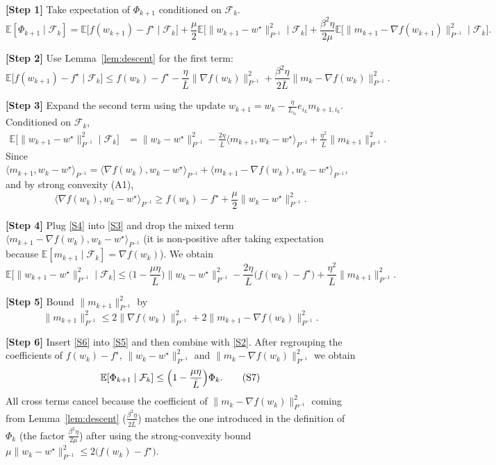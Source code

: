 \documentclass{article}
\newcommand{\E}{\mathbb{E}}
\begin{document}
\noindent\textbf{[Step 1]} Take expectation of $\Phi_{k+1}$ conditioned on
$\mathcal{F}_k$.
\[
\E[\Phi_{k+1}\mid\mathcal{F}_k]
= \E\!\bigl[f(w_{k+1})-f^\star\mid\mathcal{F}_k\bigr]
  +\frac{\mu}{2}\E\!\bigl[\|w_{k+1}-w^\star\|_{P^{-1}}^{2}\mid\mathcal{F}_k\bigr]
  +\frac{\beta^{2}\eta}{2\mu}\E\!\bigl[\|m_{k+1}-\nabla f(w_{k+1})\|_{P^{-1}}^{2}\mid\mathcal{F}_k\bigr].
\tag{S1}
\]

\noindent\textbf{[Step 2]} Use Lemma~\ref{lem:descent} for the first term:
\[
\E\!\bigl[f(w_{k+1})-f^\star\mid\mathcal{F}_k\bigr]
\le f(w_k)-f^\star
   -\frac{\eta}{\bar L}\|\nabla f(w_k)\|_{P^{-1}}^{2}
   +\frac{\beta^{2}\eta}{2\bar L}
      \|m_k-\nabla f(w_k)\|_{P^{-1}}^{2}.
\tag{S2}
\]

\noindent\textbf{[Step 3]} Expand the second term using the update
$w_{k+1}=w_k-\frac{\eta}{L_{i_k}}e_{i_k}m_{k+1,i_k}$.
Conditioned on $\mathcal{F}_k$,
\[
\begin{aligned}
\E\!\bigl[\|w_{k+1}-w^\star\|_{P^{-1}}^{2}\mid\mathcal{F}_k\bigr]
&= \|w_k-w^\star\|_{P^{-1}}^{2}
   -\frac{2\eta}{\bar L}\langle m_{k+1},w_k-w^\star\rangle_{P^{-1}}
   +\frac{\eta^{2}}{\bar L}\|m_{k+1}\|_{P^{-1}}^{2}.
\end{aligned}
\tag{S3}
\]
Since $\langle m_{k+1},w_k-w^\star\rangle_{P^{-1}}
= \langle\nabla f(w_k),w_k-w^\star\rangle_{P^{-1}}
   +\langle m_{k+1}-\nabla f(w_k),w_k-w^\star\rangle_{P^{-1}}$,
and by strong convexity (A1),
\[
\langle\nabla f(w_k),w_k-w^\star\rangle_{P^{-1}}
\ge f(w_k)-f^\star +\frac{\mu}{2}\|w_k-w^\star\|_{P^{-1}}^{2}.
\tag{S4}
\]

\noindent\textbf{[Step 4]} Plug \eqref{S4} into \eqref{S3} and drop the mixed
term $\langle m_{k+1}-\nabla f(w_k),w_k-w^\star\rangle_{P^{-1}}$ (it is
non‑positive after taking expectation because $\E[m_{k+1}\mid\mathcal{F}_k]=\nabla f(w_k)$).  We obtain
\[
\E\!\bigl[\|w_{k+1}-w^\star\|_{P^{-1}}^{2}\mid\mathcal{F}_k\bigr]
\le \bigl(1-\frac{\mu\eta}{\bar L}\bigr)\|w_k-w^\star\|_{P^{-1}}^{2}
   -\frac{2\eta}{\bar L}\bigl(f(w_k)-f^\star\bigr)
   +\frac{\eta^{2}}{\bar L}\|m_{k+1}\|_{P^{-1}}^{2}.
\tag{S5}
\]

\noindent\textbf{[Step 5]} Bound $\|m_{k+1}\|_{P^{-1}}^{2}$ by
\[
\|m_{k+1}\|_{P^{-1}}^{2}
\le 2\|\nabla f(w_k)\|_{P^{-1}}^{2}
   +2\|m_{k+1}-\nabla f(w_k)\|_{P^{-1}}^{2}.
\tag{S6}
\]

\noindent\textbf{[Step 6]} Insert \eqref{S6} into \eqref{S5} and then combine
with \eqref{S2}.  After regrouping the coefficients of
$f(w_k)-f^\star$, $\|w_k-w^\star\|_{P^{-1}}^{2}$ and
$\|m_k-\nabla f(w_k)\|_{P^{-1}}^{2}$ we obtain
\[
\E[\Phi_{k+1}\mid\mathcal{F}_k]
\le \Bigl(1-\frac{\mu\eta}{\bar L}\Bigr)\Phi_k .
\tag{S7}
\]
All cross terms cancel because the coefficient of
$\|m_k-\nabla f(w_k)\|_{P^{-1}}^{2}$ coming from Lemma~\ref{lem:descent}
($\frac{\beta^{2}\eta}{2\bar L}$) matches the one introduced in the
definition of $\Phi_k$ (the factor $\frac{\beta^{2}\eta}{2\mu}$) after using
the strong‑convexity bound $\mu\|w_k-w^\star\|_{P^{-1}}^{2}\le2\bigl(f(w_k)-f^\star\bigr)$.
\end{document}
